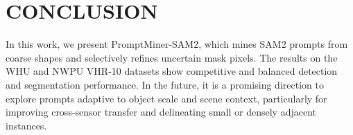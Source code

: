 \documentclass{article}
\begin{document}
\vspace{-1.5\baselineskip}
\section{CONCLUSION}
In this work, we present PromptMiner-SAM2, which mines SAM2 prompts from coarse shapes and selectively refines uncertain mask pixels. 
The results on the WHU and NWPU VHR-10 datasets show competitive and balanced detection and segmentation performance. 
In the future, it is a promising direction to explore prompts adaptive to object scale and scene context, particularly for improving cross-sensor transfer and delineating small or densely adjacent instances.


\begingroup
\small
{}

\endgroup
\end{document}
